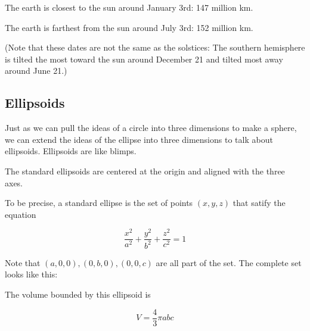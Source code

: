 The earth is closest to the sun around January 3rd: 147 million km.

The earth is farthest from the sun around July 3rd: 152 million km.

(Note that these dates are not the same as the solstices: The southern
hemisphere is tilted the most toward the sun around December 21 and
tilted most away around June 21.)

\subsection{Ellipsoids}

Just as we can pull the ideas of a circle into three dimensions to
make a sphere, we can extend the ideas of the ellipse into three
dimensions to talk about ellipsoids. Ellipsoids are like blimps.

The standard ellipsoids are centered at the origin and aligned with the three axes.

\begin{mdframed}[style=important, frametitle={Equation for a Standard Ellipsoid}]

To be precise, a standard ellipse is the set of points $(x, y, z)$ that
satify the equation

$$\frac{x^2}{a^2} + \frac{y^2}{b^2} + \frac{z^2}{c^2}= 1$$


Note that $(a,0,0), (0, b,0), (0,0,c)$ are all part of the
set. The complete set looks like this:
{}

  The volume bounded by this ellipsoid is

    $$V = \frac{4}{3} \pi a b c$$


\end{mdframed}

